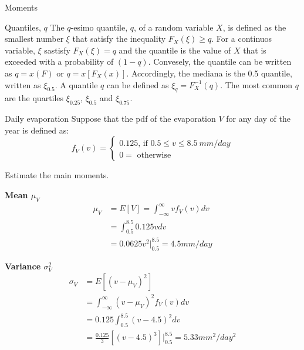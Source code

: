\documentclass[8pt]{beamer}
\begin{document}
\begin{frame}{Moments}
    \begin{block}{Quantiles, $q$}
        The $q$-esimo quantile, $q$, of a random variable $X$, is defined as the smallest  number $\xi$ that satisfy the inequality $F_X (\xi) \geq q$. For a continuos variable, $\xi$ sastisfy $F_X (\xi) = q$ and the quantile is the value of $X$ that is exceeded with a probability of $(1-q)$. Convesely, the quantile can be written as $q = x(F)$ or $q = x[F_X (x)]$. Accordingly, the mediana is the 0.5 quantile, written as $\xi_{0.5}$. A quantile $q$ can be defined as $\xi_q = F_X^{-1} (q)$. The most common $q$ are the quartiles $\xi_{0.25}$, $\xi_{0.5}$ and $\xi_{0.75}$. 
\end{block}
\vspace{-6pt}
    \begin{exampleblock}{Daily evaporation}
        Suppose that the pdf of the evaporation $V$ for any day of the year is defined as:
\[
f_V (v) = 
\left\{
\begin{array}{l}
    0.125 \text{, if } 0.5\leq v \leq 8.5 \ mm/day  \\
    0 = \text{ otherwise} 
\end{array}
\right.
\]

Estimate the main moments. 

\begin{minipage}[t]{0.44\textwidth}
\centering
\textbf{Mean $\mu_V$}
\begin{align*}
    \mu_V&= E \left[ V \right] = \int_{-\infty}^{\infty}v f_V(v) dv \\
         &= \int_{0.5}^{8.5} 0.125 v dv\\ 
               &= 0.0625 v^2 \Big|_{0.5}^{8.5} = 4.5 mm/day
\end{align*}
\end{minipage}
\begin{minipage}[t]{0.44\textwidth}
\centering
\textbf{Variance $\sigma_V^2$}
\begin{align*}
    \sigma_V&= E \left[ (v -\mu_V)^2 \right] \\
            &= \int_{-\infty}^{\infty} (v-\mu_V)^2 f_V(v) dv \\
            &= 0.125 \int_{0.5}^{8.5}  (v-4.5)^2 dv\\ 
            &= \frac{0.125}{3} \left[ (v-4.5)^3 \right] \Big|_{0.5}^{8.5} = 5.33 mm^2 /day^2
\end{align*}
\end{minipage}
    \end{exampleblock}
\end{frame}
\end{document}
